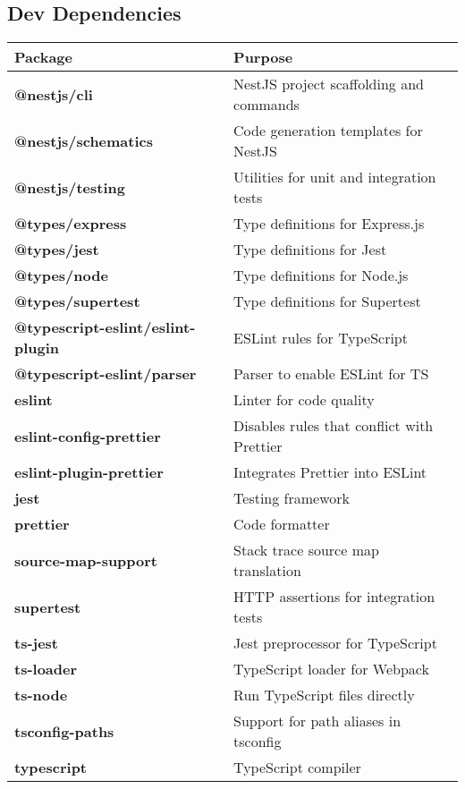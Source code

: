 \subsection{Dev Dependencies}

\begin{tabular}{>{\bfseries}l l}
\toprule
Package & Purpose \\
\midrule
@nestjs/cli & NestJS project scaffolding and commands \\
@nestjs/schematics & Code generation templates for NestJS \\
@nestjs/testing & Utilities for unit and integration tests \\
@types/express & Type definitions for Express.js \\
@types/jest & Type definitions for Jest \\
@types/node & Type definitions for Node.js \\
@types/supertest & Type definitions for Supertest \\
@typescript-eslint/eslint-plugin & ESLint rules for TypeScript \\
@typescript-eslint/parser & Parser to enable ESLint for TS \\
eslint & Linter for code quality \\
eslint-config-prettier & Disables rules that conflict with Prettier \\
eslint-plugin-prettier & Integrates Prettier into ESLint \\
jest & Testing framework \\
prettier & Code formatter \\
source-map-support & Stack trace source map translation \\
supertest & HTTP assertions for integration tests \\
ts-jest & Jest preprocessor for TypeScript \\
ts-loader & TypeScript loader for Webpack \\
ts-node & Run TypeScript files directly \\
tsconfig-paths & Support for path aliases in tsconfig \\
typescript & TypeScript compiler \\
\bottomrule
\end{tabular}